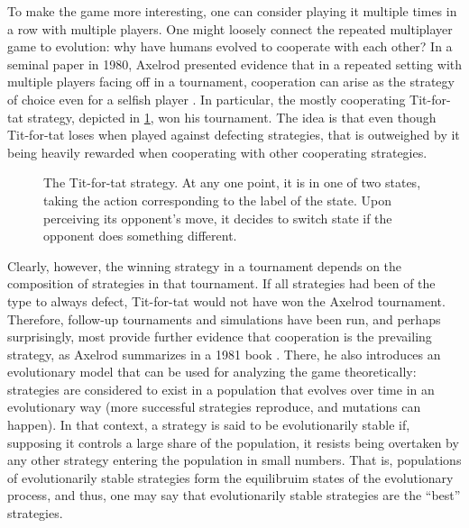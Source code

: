 \documentclass[11pt]{amsart}
\theoremstyle{definition}
\theoremstyle{remark}
\begin{document}
To make the game more interesting, one can consider playing it multiple times in a row with multiple players. One might loosely connect the repeated multiplayer game to evolution: why have humans evolved to cooperate with each other? In a seminal paper in 1980, Axelrod presented evidence that in a repeated setting with multiple players facing off in a tournament, cooperation can arise as the strategy of choice even for a selfish player \cite{axelrod1980effective}. In particular, the mostly cooperating Tit-for-tat strategy, depicted in \cref{tftfigure}, won his tournament. The idea is that even though Tit-for-tat loses when played against defecting strategies, that is outweighed by it being heavily rewarded when cooperating with other cooperating strategies.

\begin{figure}
  \centering
  \caption{The Tit-for-tat strategy. At any one point, it is in one of two states, taking the action corresponding to the label of the state. Upon perceiving its opponent's move, it decides to switch state if the opponent does something different.}
  \label{tftfigure}
\end{figure}

Clearly, however, the winning strategy in a tournament depends on the composition of strategies in that tournament. If all strategies had been of the type to always defect, Tit-for-tat would not have won the Axelrod tournament. Therefore, follow-up tournaments and simulations have been run, and perhaps surprisingly, most provide further evidence that cooperation is the prevailing strategy, as Axelrod summarizes in a 1981 book \cite{axelrod1981evolution}. There, he also introduces an evolutionary model that can be used for analyzing the game theoretically: strategies are considered to exist in a population that evolves over time in an evolutionary way (more successful strategies reproduce, and mutations can happen). In that context, a strategy is said to be evolutionarily stable if, supposing it controls a large share of the population, it resists being overtaken by any other strategy entering the population in small numbers. That is, populations of evolutionarily stable strategies form the equilibruim states of the evolutionary process, and thus, one may say that evolutionarily stable strategies are the ``best'' strategies.
\end{document}
